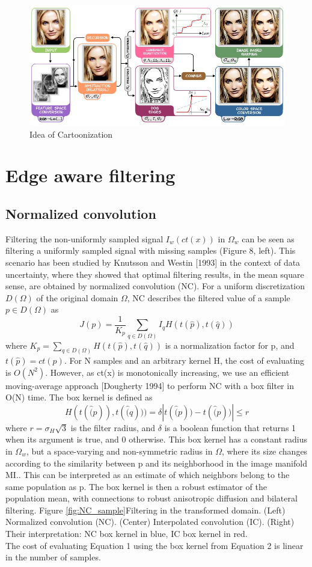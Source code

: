 \documentclass[conference]{IEEEtran}
\begin{document}
\begin{figure}
 	\includegraphics[width = \linewidth]{Idea.jpg}
 	\caption{Idea of Cartoonization}
 	\label{fig:Idea}
 \end{figure}
 
 \section{Edge aware filtering}
 \subsection{Normalized convolution}
Filtering the non-uniformly sampled signal $I_w(ct(x))$ in $\Omega_w$ can be seen as filtering a uniformly sampled signal with missing samples (Figure 8, left). This scenario has been studied by Knutsson and Westin [1993] in the context of data uncertainty, where they showed that optimal filtering results, in the mean square sense, are obtained by normalized convolution (NC). For a uniform discretization $D(\Omega)$ of the original domain $\Omega$, NC describes the filtered value of a sample $p \in D(\Omega)$ as
$$J(p) = \frac{1}{K_p}\sum_{q \in D(\Omega)}I_qH(t(\hat{p}),t(\hat{q}))$$
where $K_p = \sum_{q \in D(\Omega)}H(t(\hat{p}),t(\hat{q}))$  is a normalization factor for p, and $t(\hat{p}) = ct(p)$. For N samples and an arbitrary kernel H, the cost of evaluating is $O(N^2 )$. However, as ct(x) is monotonically increasing, we use an efficient moving-average approach [Dougherty 1994] to perform NC with a box filter in O(N) time. The box kernel is defined as
$$H(t(\hat(p)),t(\hat(q))) = \delta{|t(\hat(p)) - t(\hat(p))| \leq r}$$ 
where $r = \sigma_H \sqrt{ 3}$ is the filter radius, and $\delta$ is a boolean function that returns 1 when its argument is true, and 0 otherwise. This box kernel has a constant radius in $\Omega_w$, but a space-varying and non-symmetric radius in $\Omega$, where its size changes according to the similarity between p and its neighborhood in the image manifold MI.. This can be interpreted as an estimate of which neighbors belong to the same population as p. The box kernel is then a robust estimator of the population mean, with connections to robust anisotropic diffusion and bilateral filtering.
 Figure \ref{fig:NC_sample}Filtering in the transformed domain. (Left) Normalized convolution (NC). (Center) Interpolated convolution (IC). (Right) Their interpretation: NC box kernel in blue, IC box kernel in red.\\
 The cost of evaluating Equation 1 using the box kernel from Equation 2 is linear in the number of samples. 
 
\end{document}
